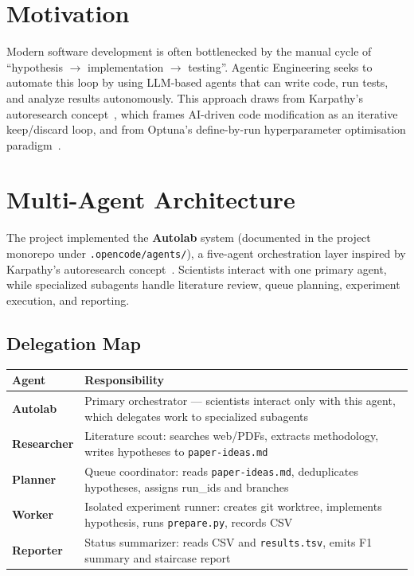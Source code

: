 \section{Motivation}\label{motivation-agentic}

Modern software development is often bottlenecked by the manual cycle of ``hypothesis \(\rightarrow\) implementation \(\rightarrow\) testing''. Agentic Engineering seeks to automate this loop by using LLM-based agents that can write code, run tests, and analyze results autonomously. This approach draws from Karpathy's autoresearch concept~\cite{karpathy2026autoresearch}, which frames AI-driven code modification as an iterative keep/discard loop, and from Optuna's define-by-run hyperparameter optimisation paradigm~\cite{akiba2019optuna}.

\section{Multi-Agent Architecture}\label{multi-agent-architecture}

The project implemented the \textbf{Autolab} system (documented in the project monorepo under \texttt{.opencode/agents/}), a five-agent orchestration layer inspired by Karpathy's autoresearch concept~\cite{karpathy2026autoresearch}. Scientists interact with one primary agent, while specialized subagents handle literature review, queue planning, experiment execution, and reporting.

\subsection{Delegation Map}\label{delegation-map}

\begin{center}
\small
\begin{tabular}{@{}p{2.7cm} p{9.8cm}@{}}
\toprule
\textbf{Agent} & \textbf{Responsibility} \\
\midrule
\textbf{Autolab} & Primary orchestrator --- scientists interact only with this agent, which delegates work to specialized subagents \\
\textbf{Researcher} & Literature scout: searches web/PDFs, extracts methodology, writes hypotheses to \texttt{paper-ideas.md} \\
\textbf{Planner} & Queue coordinator: reads \texttt{paper-ideas.md}, deduplicates hypotheses, assigns run\_ids and branches \\
\textbf{Worker} & Isolated experiment runner: creates git worktree, implements hypothesis, runs \texttt{prepare.py}, records CSV \\
\textbf{Reporter} & Status summarizer: reads CSV and \texttt{results.tsv}, emits F1 summary and staircase report \\
\bottomrule
\end{tabular}
\normalsize
\end{center}

